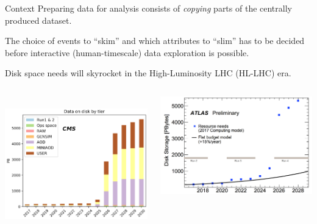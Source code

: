 \documentclass[aspectratio=169]{beamer}
\begin{document}
\begin{frame}{Context}
\vspace{0.25 cm}
Preparing data for analysis consists of {\it copying} parts of the centrally produced dataset.

\vspace{0.25 cm}
The choice of events to ``skim'' and which attributes to ``slim'' has to be decided before interactive (human-timescale) data exploration is possible.

\vspace{0.25 cm}
Disk space needs will skyrocket in the High-Luminosity LHC (HL-LHC) era.

\vspace{0.5 cm}
\begin{columns}[c]
\mbox{ } \hfill \includegraphics[height=4.5 cm]{cms-data-explosion.png}


\vspace{0.2 cm}
\includegraphics[height=4.4 cm]{atlas-data-explosion.png} \hfill \mbox{ }
\end{columns}
\end{frame}
\end{document}
